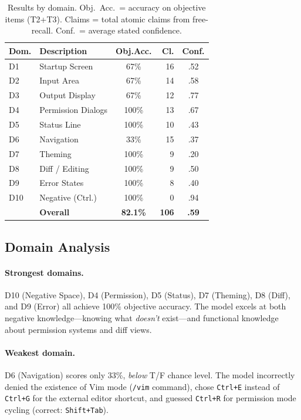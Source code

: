 \documentclass[10pt,twocolumn]{article}
\begin{document}
\begin{table}[t]
\centering
\caption{Results by domain. Obj.\ Acc.\ = accuracy on objective items (T2+T3). Claims = total atomic claims from free-recall. Conf.\ = average stated confidence.}
\label{tab:results}
\small
\begin{tabular}{@{}llcrc@{}}
\toprule
\textbf{Dom.} & \textbf{Description} & \textbf{Obj.Acc.} & \textbf{Cl.} & \textbf{Conf.} \\
\midrule
D1  & Startup Screen        & 67\%  & 16 & .52 \\
D2  & Input Area            & 67\%  & 14 & .58 \\
D3  & Output Display        & 67\%  & 12 & .77 \\
D4  & Permission Dialogs    & \textcolor{correctgreen}{100\%} & 13 & .67 \\
D5  & Status Line           & \textcolor{correctgreen}{100\%} & 10 & .43 \\
D6  & Navigation            & \textcolor{wrongred}{33\%}  & 15 & .37 \\
D7  & Theming               & \textcolor{correctgreen}{100\%} &  9 & .20 \\
D8  & Diff / Editing        & \textcolor{correctgreen}{100\%} &  9 & .50 \\
D9  & Error States          & \textcolor{correctgreen}{100\%} &  8 & .40 \\
D10 & Negative (Ctrl.)      & \textcolor{correctgreen}{100\%} &  0 & .94 \\
\midrule
    & \textbf{Overall}      & \textbf{82.1\%} & \textbf{106} & \textbf{.59} \\
\bottomrule
\end{tabular}
\end{table}

\subsection{Domain Analysis}

\paragraph{Strongest domains.}
D10 (Negative Space), D4 (Permission), D5 (Status), D7 (Theming), D8 (Diff), and D9 (Error) all achieve 100\% objective accuracy.
The model excels at both negative knowledge---knowing what \textit{doesn't} exist---and functional knowledge about permission systems and diff views.

\paragraph{Weakest domain.}
D6 (Navigation) scores only 33\%, \textit{below} T/F chance level.
The model incorrectly denied the existence of Vim mode (\texttt{/vim} command), chose \texttt{Ctrl+E} instead of \texttt{Ctrl+G} for the external editor shortcut, and guessed \texttt{Ctrl+R} for permission mode cycling (correct: \texttt{Shift+Tab}).
\end{document}
